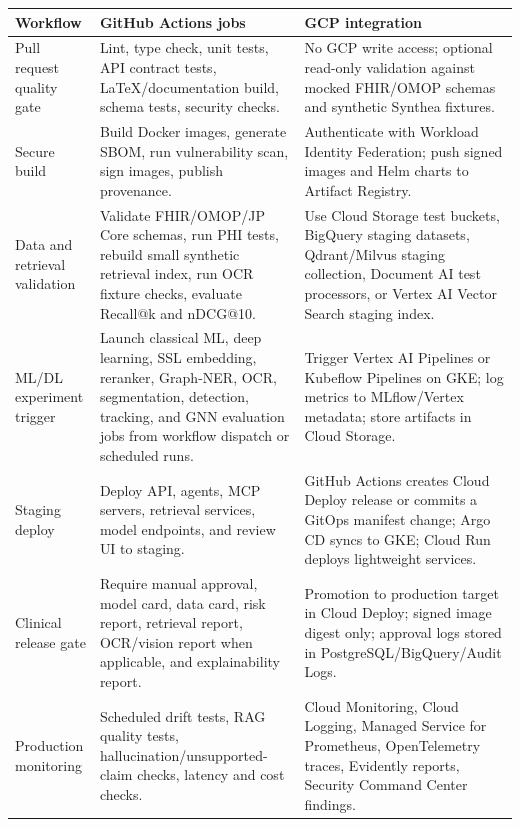 \begin{longtable}{p{}p{}p{}}
\toprule
\textbf{Workflow} & \textbf{GitHub Actions jobs} & \textbf{GCP integration} \\
\midrule
Pull request quality gate & Lint, type check, unit tests, API contract tests, LaTeX/documentation build, schema tests, security checks. & No GCP write access; optional read-only validation against mocked FHIR/OMOP schemas and synthetic Synthea fixtures. \\
\addlinespace
Secure build & Build Docker images, generate SBOM, run vulnerability scan, sign images, publish provenance. & Authenticate with Workload Identity Federation; push signed images and Helm charts to Artifact Registry. \\
\addlinespace
Data and retrieval validation & Validate FHIR/OMOP/JP Core schemas, run PHI tests, rebuild small synthetic retrieval index, run OCR fixture checks, evaluate Recall@k and nDCG@10. & Use Cloud Storage test buckets, BigQuery staging datasets, Qdrant/Milvus staging collection, Document AI test processors, or Vertex AI Vector Search staging index. \\
\addlinespace
ML/DL experiment trigger & Launch classical ML, deep learning, SSL embedding, reranker, Graph-NER, OCR, segmentation, detection, tracking, and GNN evaluation jobs from workflow dispatch or scheduled runs. & Trigger Vertex AI Pipelines or Kubeflow Pipelines on GKE; log metrics to MLflow/Vertex metadata; store artifacts in Cloud Storage. \\
\addlinespace
Staging deploy & Deploy API, agents, MCP servers, retrieval services, model endpoints, and review UI to staging. & GitHub Actions creates Cloud Deploy release or commits a GitOps manifest change; Argo CD syncs to GKE; Cloud Run deploys lightweight services. \\
\addlinespace
Clinical release gate & Require manual approval, model card, data card, risk report, retrieval report, OCR/vision report when applicable, and explainability report. & Promotion to production target in Cloud Deploy; signed image digest only; approval logs stored in PostgreSQL/BigQuery/Audit Logs. \\
\addlinespace
Production monitoring & Scheduled drift tests, RAG quality tests, hallucination/unsupported-claim checks, latency and cost checks. & Cloud Monitoring, Cloud Logging, Managed Service for Prometheus, OpenTelemetry traces, Evidently reports, Security Command Center findings. \\
\bottomrule
\end{longtable}

